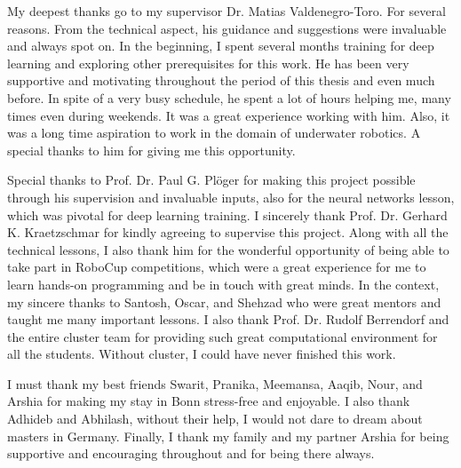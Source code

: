 \documentclass[thesis]{mas_report}
\begin{document}
\begin{acknowledgements}
 My deepest thanks go to my supervisor Dr. Matias Valdenegro-Toro. For several reasons. From the technical aspect, his guidance and suggestions were invaluable and always spot on.
 In the beginning, I spent several months training for deep learning and exploring other prerequisites for this work. He has been very supportive and motivating throughout the period of this thesis and even much before.
 In spite of a very busy schedule, he spent a lot of hours helping me, many times even during weekends. It was a great experience working with him. Also, it was a long time aspiration to work in the domain of underwater robotics. 
 A special thanks to him for giving me this opportunity.
 
 Special thanks to Prof. Dr. Paul G. Pl\"oger for making this project possible through his supervision and invaluable inputs, also for the neural networks lesson, which was pivotal for deep learning training.
 I sincerely thank Prof. Dr. Gerhard K. Kraetzschmar for kindly agreeing to supervise this project. Along with all the technical lessons, 
 I also thank him for the wonderful opportunity of being able to take part in RoboCup competitions, which were a great experience for me to learn hands-on programming and be in touch with great minds. In the context, 
 my sincere thanks to Santosh, Oscar, and Shehzad who were great mentors and taught me many important lessons. I also thank Prof. Dr. Rudolf Berrendorf and the entire cluster team for providing such great computational environment for all the students. Without cluster, I could have never finished this work.
 
 I must thank my best friends Swarit, Pranika, Meemansa, Aaqib, Nour, and Arshia for making my stay in Bonn stress-free and enjoyable. I also thank Adhideb and Abhilash, without their help, I would not dare to dream about masters in Germany.
 Finally, I thank my family and my partner Arshia for being supportive and encouraging throughout and for being there always. 
  
\end{acknowledgements}


\tableofcontents
\listoffigures
\listoftables


\mainmatter %
\end{document}

